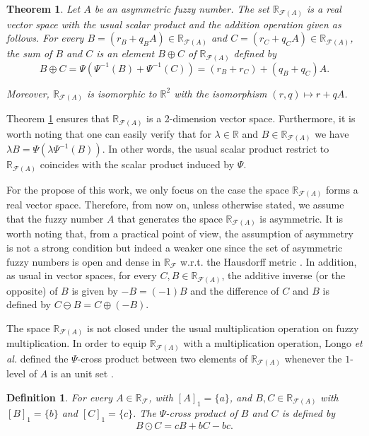 \documentclass[12pt,a4paper]{article}
\newcommand{\RR}{\mathbb{R}}
\newcommand{\RF}{\mathbb{R}_\mathcal{F}}
\newcommand{\RFA}{\mathbb{R}_{\mathcal{F}(A)}}
\newtheorem{theorem}{Theorem}
\newtheorem{definition}{Definition}
\begin{document}
\begin{theorem} \cite{esmi2018frechet} \label{thm:rfa_space}
Let $A$ be an asymmetric fuzzy number. The set $\RFA$ is a real vector space with the usual scalar product and the addition operation given as follows. 
For every $B=(r_B + q_BA) \in \RFA$ and $C=(r_C + q_CA) \in \RFA$, the sum of $B$ and $C$ 
is an element $B \oplus C$ of $\RFA$ defined by 
\begin{equation}
B \oplus C  = \Psi\left(\Psi^{-1}(B) +  \Psi^{-1}(C) \right) = (r_B+r_C) + (q_B+q_C)A.     
\end{equation}

Moreover, $\RFA$ is isomorphic to $\RR^2$ with the isomorphism $(r,q)\mapsto r + qA$. 
\end{theorem}

Theorem \ref{thm:rfa_space} ensures that $\RFA$ is a 2-dimension vector space.  
Furthermore, it is worth noting that one can easily verify that for $\lambda \in \RR$ and $B \in \RFA$ we have $\lambda B =  \Psi\left(\lambda \Psi^{-1}(B)\right).$ 
In other words, the usual scalar product restrict to $\RFA$ coincides with the scalar product induced by $\Psi$.
 

For the propose of this work, we only focus on the case the space $\RFA$ forms a real vector space.
Therefore, from now on, unless otherwise stated, we assume that the fuzzy number $A$ that generates the space $\RFA$ is asymmetric. It is worth noting that, from a practical point of view, the assumption of asymmetry is not a strong condition but indeed a weaker one since the set of asymmetric fuzzy numbers is open and dense in $\RF$ w.r.t. the Hausdorff metric \cite{esmi2021banach}.
In addition, as usual in vector spaces, for every $C, B \in \RFA$, the additive inverse (or the opposite) of $B$ is given by $-B = (-1)B$ and the difference of $C$ and $B$ is defined 
by $C\ominus B = C \oplus (-B)$.   


The space $\RFA$ is not closed under the usual multiplication operation on fuzzy multiplication. 
In order to equip $\RFA$ with a multiplication operation,  
Longo {\it et al.} defined the $\Psi$-cross product between two elements of $\RFA$ whenever the $1$-level of $A$ is an unit set \cite{longo2022cross}.

\begin{definition}\label{def:multiplication} \cite{longo2022cross}
For every $A \in \RF$, with $[A]_1 = \{a\}$, and $B, C \in \RFA$ with $[B]_1 = \{b\}$ and $[C]_1 = \{c\}$. The $\Psi$-cross product of $B$ and $C$ is defined by
\begin{equation}\label{eq:cross_product_original}
B \odot C = cB + bC - bc. 
\end{equation}
\end{definition}
\end{document}
